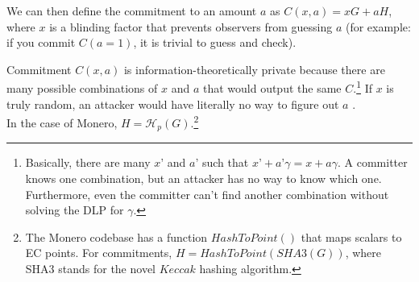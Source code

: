 We can then define the commitment to an amount \(a\) as \(C(x, a) = x G + a H\), where \(x\) is a blinding factor that prevents observers from guessing $a$ (for example: if you commit $C(a=1)$, it is trivial to guess and check). 

Commitment $C(x, a)$ is information-theoretically private because there are many possible combinations of $x$ and $a$ that would output the same $C$.\footnote{Basically, there are many $x’$ and $a’$ such that $x’+a’ \gamma = x+a \gamma$. A committer knows one combination, but an attacker has no way to know which one. Furthermore, even the committer can't find another combination without solving the DLP for $\gamma$.} If $x$ is truly random, an attacker would have literally no way to figure out $a$ \cite{maxwell-ct}.%
\\

In the case of Monero, $H = \mathcal{H}_p(G)$.\footnote{\label{hashtopoint_note}The Monero codebase has a function $HashToPoint()$ that maps scalars to EC points. For commitments, $H = HashToPoint(SHA3(G))$, where SHA3 stands for the novel $\mathit{Keccak}$ hashing algorithm.}



%
%
%
%
%
%
